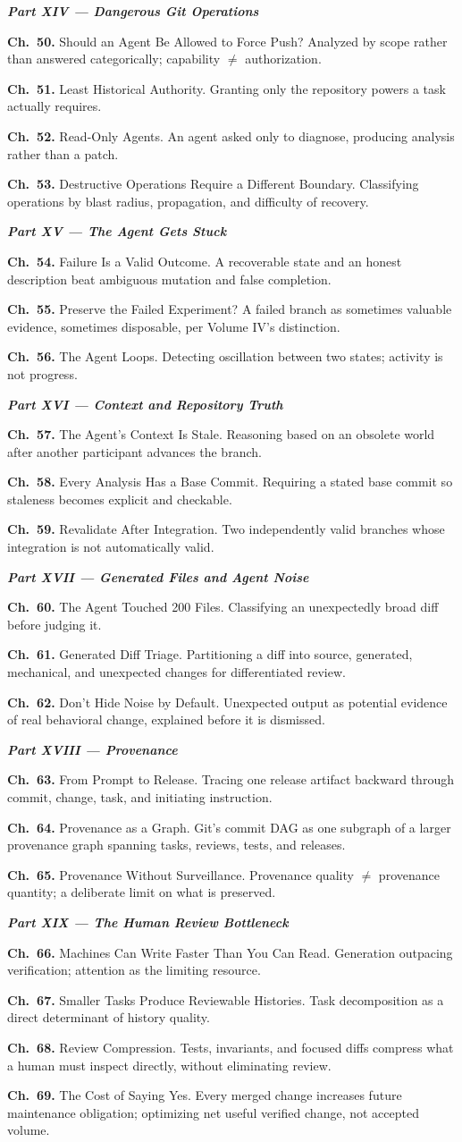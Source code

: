 \documentclass[11pt]{book}
\newcommand{\chapentry}[2]{\noindent\textbf{Ch.~#1.} #2\par\smallskip}
\newcommand{\partheading}[1]{\bigskip\noindent\textbf{\textit{#1}}\smallskip\par}
\begin{document}
\partheading{Part XIV --- Dangerous Git Operations}
\chapentry{50}{Should an Agent Be Allowed to Force Push? Analyzed by scope rather than answered categorically; capability $\neq$ authorization.}
\chapentry{51}{Least Historical Authority. Granting only the repository powers a task actually requires.}
\chapentry{52}{Read-Only Agents. An agent asked only to diagnose, producing analysis rather than a patch.}
\chapentry{53}{Destructive Operations Require a Different Boundary. Classifying operations by blast radius, propagation, and difficulty of recovery.}

\partheading{Part XV --- The Agent Gets Stuck}
\chapentry{54}{Failure Is a Valid Outcome. A recoverable state and an honest description beat ambiguous mutation and false completion.}
\chapentry{55}{Preserve the Failed Experiment? A failed branch as sometimes valuable evidence, sometimes disposable, per Volume IV's distinction.}
\chapentry{56}{The Agent Loops. Detecting oscillation between two states; activity is not progress.}

\partheading{Part XVI --- Context and Repository Truth}
\chapentry{57}{The Agent's Context Is Stale. Reasoning based on an obsolete world after another participant advances the branch.}
\chapentry{58}{Every Analysis Has a Base Commit. Requiring a stated base commit so staleness becomes explicit and checkable.}
\chapentry{59}{Revalidate After Integration. Two independently valid branches whose integration is not automatically valid.}

\partheading{Part XVII --- Generated Files and Agent Noise}
\chapentry{60}{The Agent Touched 200 Files. Classifying an unexpectedly broad diff before judging it.}
\chapentry{61}{Generated Diff Triage. Partitioning a diff into source, generated, mechanical, and unexpected changes for differentiated review.}
\chapentry{62}{Don't Hide Noise by Default. Unexpected output as potential evidence of real behavioral change, explained before it is dismissed.}

\partheading{Part XVIII --- Provenance}
\chapentry{63}{From Prompt to Release. Tracing one release artifact backward through commit, change, task, and initiating instruction.}
\chapentry{64}{Provenance as a Graph. Git's commit DAG as one subgraph of a larger provenance graph spanning tasks, reviews, tests, and releases.}
\chapentry{65}{Provenance Without Surveillance. Provenance quality $\neq$ provenance quantity; a deliberate limit on what is preserved.}

\partheading{Part XIX --- The Human Review Bottleneck}
\chapentry{66}{Machines Can Write Faster Than You Can Read. Generation outpacing verification; attention as the limiting resource.}
\chapentry{67}{Smaller Tasks Produce Reviewable Histories. Task decomposition as a direct determinant of history quality.}
\chapentry{68}{Review Compression. Tests, invariants, and focused diffs compress what a human must inspect directly, without eliminating review.}
\chapentry{69}{The Cost of Saying Yes. Every merged change increases future maintenance obligation; optimizing net useful verified change, not accepted volume.}
\end{document}
